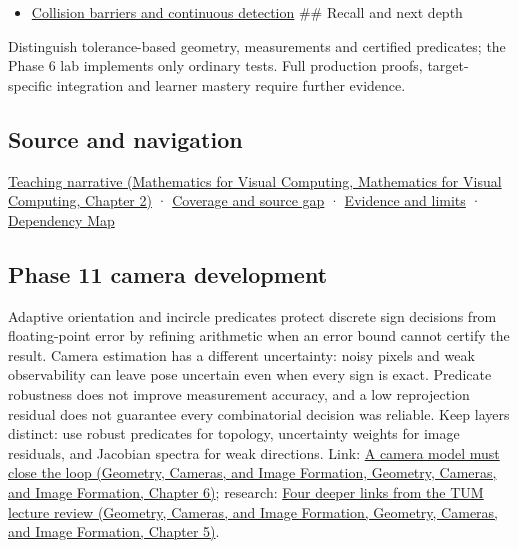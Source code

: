 \begin{itemize}
\tightlist
\item
  \hyperref[appendix-a9ba01fa72a6]{Collision barriers and continuous detection} \#\# Recall and next depth
\end{itemize}

Distinguish tolerance-based geometry, measurements and certified predicates; the Phase 6 lab implements only ordinary tests. Full production proofs, target-specific integration and learner mastery require further evidence.

\subsection{Source and navigation}\label{appendix-341296fb3f64-source-and-navigation}

\href{../02-Mathematics-for-Visual-Computing/main.pdf\#nameddest=01-foundations-i-ch018-the-sensor-needs-coordinates-inside-the-triangle}{Teaching narrative (Mathematics for Visual Computing, Mathematics for Visual Computing, Chapter 2)} · \hyperref[appendix-fd090d982a15-phase-6---parts-501-600]{Coverage and source gap} · \hyperref[appendix-a103e7846d21-phase-6---source-analysis-and-verification]{Evidence and limits} · \hyperref[appendix-4ad47bdd269a]{Dependency Map}

\subsection{Phase 11 camera development}\label{appendix-341296fb3f64-phase-11-camera-development}

Adaptive orientation and incircle predicates protect discrete sign decisions from floating-point error by refining arithmetic when an error bound cannot certify the result. Camera estimation has a different uncertainty: noisy pixels and weak observability can leave pose uncertain even when every sign is exact. Predicate robustness does not improve measurement accuracy, and a low reprojection residual does not guarantee every combinatorial decision was reliable. Keep layers distinct: use robust predicates for topology, uncertainty weights for image residuals, and Jacobian spectra for weak directions. Link: \href{../03-Geometry-Cameras-and-Image-Formation/main.pdf\#nameddest=02-foundations-ii-ch037-a-camera-model-must-close-the-loop}{A camera model must close the loop (Geometry, Cameras, and Image Formation, Geometry, Cameras, and Image Formation, Chapter 6)}; research: \href{../03-Geometry-Cameras-and-Image-Formation/main.pdf\#nameddest=02-foundations-ii-ch036-four-deeper-links-from-the-tum-lecture-review}{Four deeper links from the TUM lecture review (Geometry, Cameras, and Image Formation, Geometry, Cameras, and Image Formation, Chapter 5)}.
